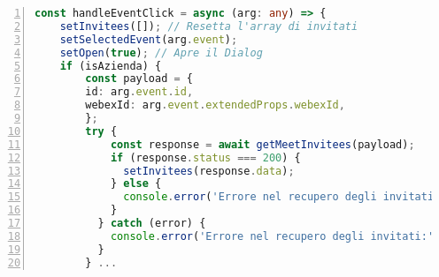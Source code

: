 \begin{lstlisting}[language=typescript, frame=lines, basicstyle=\ttfamily\scriptsize, numbers=left]
const handleEventClick = async (arg: any) => {
    setInvitees([]); // Resetta l'array di invitati
    setSelectedEvent(arg.event);
    setOpen(true); // Apre il Dialog 
    if (isAzienda) {
        const payload = {
        id: arg.event.id,
        webexId: arg.event.extendedProps.webexId,
        };   
        try {
            const response = await getMeetInvitees(payload);
            if (response.status === 200) {
              setInvitees(response.data);
            } else {
              console.error('Errore nel recupero degli invitati:', response.statusText);
            }
          } catch (error) {
            console.error('Errore nel recupero degli invitati:', error);
          }
        } ...
\end{lstlisting}